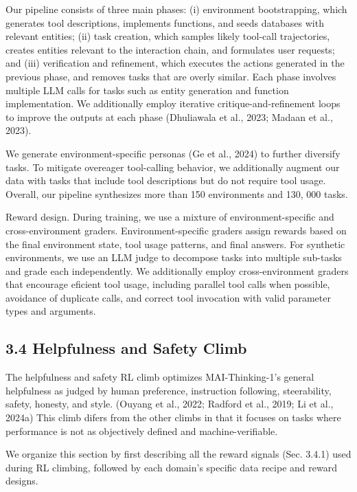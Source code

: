 \documentclass[
  10
]{article}
\begin{document}
Our pipeline consists of three main phases: (i) environment
bootstrapping, which generates tool descriptions, implements functions,
and seeds databases with relevant entities; (ii) task creation, which
samples likely tool-call trajectories, creates entities relevant to the
interaction chain, and formulates user requests; and (iii) verification
and refinement, which executes the actions generated in the previous
phase, and removes tasks that are overly similar. Each phase involves
multiple LLM calls for tasks such as entity generation and function
implementation. We additionally employ iterative critique-and-refinement
loops to improve the outputs at each phase (Dhuliawala et al., 2023;
Madaan et al., 2023).

We generate environment-specific personas (Ge et al., 2024) to further
diversify tasks. To mitigate overeager tool-calling behavior, we
additionally augment our data with tasks that include tool descriptions
but do not require tool usage. Overall, our pipeline synthesizes more
than 150 environments and 130, 000 tasks.

Reward design. During training, we use a mixture of environment-specific
and cross-environment graders. Environment-specific graders assign
rewards based on the final environment state, tool usage patterns, and
final answers. For synthetic environments, we use an LLM judge to
decompose tasks into multiple sub-tasks and grade each independently. We
additionally employ cross-environment graders that encourage eficient
tool usage, including parallel tool calls when possible, avoidance of
duplicate calls, and correct tool invocation with valid parameter types
and arguments.

\subsection{3.4 Helpfulness and Safety
Climb}\label{helpfulness-and-safety-climb}

The helpfulness and safety RL climb optimizes MAI-Thinking-1's general
helpfulness as judged by human preference, instruction following,
steerability, safety, honesty, and style. (Ouyang et al., 2022; Radford
et al., 2019; Li et al., 2024a) This climb difers from the other climbs
in that it focuses on tasks where performance is not as objectively
defined and machine-verifiable.

We organize this section by first describing all the reward signals
(Sec. 3.4.1) used during RL climbing, followed by each domain's specific
data recipe and reward designs.
\end{document}
